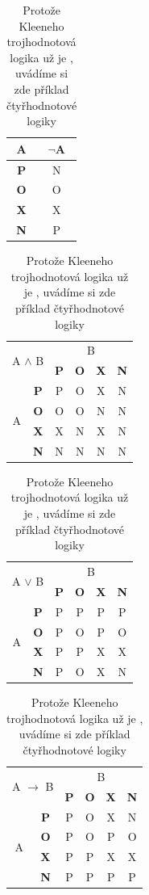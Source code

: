 \documentclass[11pt, a4paper]{article}
\begin{document}
\begin{table}[h]
    \centering
    \begin{tabular}{|c|c|}
        \hline
        A & $\neg$A \\ \hline
        \textbf{P} & N \\ \hline
        \textbf{O} & O \\ \hline
        \textbf{X} & X \\ \hline
        \textbf{N} & P \\ \hline
    \end{tabular}
    \begin{tabular}{|c|c|c|c|c|c|}
        \hline
        \multicolumn{2}{|c|}{\multirow{2}{*}{A $\wedge$ B}} & \multicolumn{4}{|c|}{B} \\ \cline{3-6}
        \multicolumn{2}{|c|}{} & \textbf{P} & \textbf{O} & \textbf{X} & \textbf{N} \\ \hline
        \multirow{4}{1em}{A} & \textbf{P} & P & O & X & N \\ \cline{2-6}
         & \textbf{O} & O & O & N & N \\ \cline{2-6}
         & \textbf{X} & X & N & X & N \\ \cline{2-6}
         & \textbf{N} & N & N & N & N \\ \hline
    \end{tabular}
    \begin{tabular}{|c|c|c|c|c|c|}
        \hline
        \multicolumn{2}{|c|}{\multirow{2}{*}{A $\vee$ B}} & \multicolumn{4}{|c|}{B} \\ \cline{3-6}
        \multicolumn{2}{|c|}{} & \textbf{P} & \textbf{O} & \textbf{X} & \textbf{N} \\ \hline
        \multirow{4}{1em}{A} & \textbf{P} & P & P & P & P \\ \cline{2-6}
        & \textbf{O} & P & O & P & O \\ \cline{2-6} 
        & \textbf{X} & P & P & X & X \\ \cline{2-6}
        & \textbf{N} & P &O & X & N \\ \hline
    \end{tabular}
    \begin{tabular}{|c|c|c|c|c|c|}
         \hline
        \multicolumn{2}{|c|}{\multirow{2}{*}{A $\rightarrow$ B}} & \multicolumn{4}{|c|}{B} \\ \cline{3-6}
        \multicolumn{2}{|c|}{} & \textbf{P} & \textbf{O} & \textbf{X} & \textbf{N} \\ \hline
        \multirow{4}{1em}{A} & \textbf{P} & P & O & X & N \\ \cline{2-6}
        & \textbf{O} & P & O & P & O \\ \cline{2-6} 
        & \textbf{X} & P & P & X & X \\ \cline{2-6}
        & \textbf{N} & P & P & P & P \\ \hline
    \end{tabular}
    \caption{Protože Kleeneho trojhodnotová logika už je , uvádíme si zde příklad čtyřhodnotové logiky}\label{tab-fce}
\end{table}
\newpage
\end{document}
